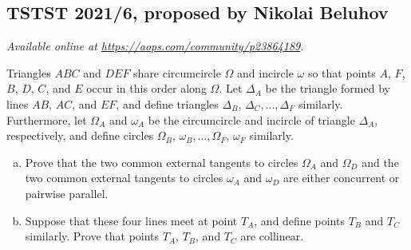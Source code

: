 \documentclass[11pt]{scrartcl}
\begin{document}
\subsection{TSTST 2021/6, proposed by Nikolai Beluhov}
\textsl{Available online at \url{https://aops.com/community/p23864189}.}
\begin{mdframed}[style=mdpurplebox,frametitle={Problem statement}]
Triangles $ABC$ and $DEF$ share circumcircle $\Omega$ and incircle $\omega$
so that points $A$, $F$, $B$, $D$, $C$, and $E$ occur in this order along $\Omega$.
Let $\Delta_A$ be the triangle formed by lines $AB$, $AC$, and $EF$,
and define triangles $\Delta_B$, $\Delta_C, \dots, \Delta_F$ similarly.
Furthermore, let $\Omega_A$ and $\omega_A$ be the circumcircle and incircle
of triangle $\Delta_A$, respectively, and define circles
$\Omega_B$, $\omega_B, \dots, \Omega_F$, $\omega_F$ similarly.
\begin{enumerate}[(a)]
  \item Prove that the two common external tangents to circles $\Omega_A$ and $\Omega_D$
    and the two common external tangents to circles $\omega_A$ and $\omega_D$
    are either concurrent or pairwise parallel.

  \item Suppose that these four lines meet at point $T_A$,
    and define points $T_B$ and $T_C$ similarly.
    Prove that points $T_A$, $T_B$, and $T_C$ are collinear.
\end{enumerate}
\end{mdframed}
\end{document}
